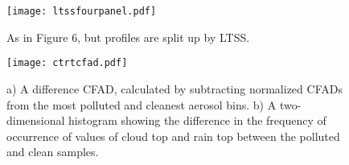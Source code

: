  \begin{figure}[t]
 \noindent\texttt{[image: ltssfourpanel.pdf]}
 \caption{As in Figure 6, but profiles are split up by LTSS.}\label{fig7}
 \end{figure} 
 
  \begin{figure}[t]
 \noindent\texttt{[image: ctrtcfad.pdf]}
 \caption{a) A difference CFAD, calculated by subtracting normalized CFADs from the most polluted and cleanest aerosol bins.  b) A two-dimensional histogram showing the difference in the frequency of occurrence of values of cloud top and rain top between the polluted and clean samples.}\label{fig8}
 \end{figure}
 
% 
%
%
%
%
%
%


\clearpage

